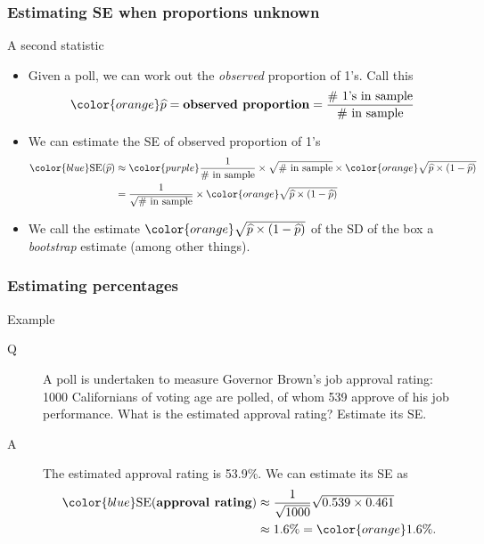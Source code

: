 \documentclass[handout]{beamer}
\begin{document}
   \begin{frame} \frametitle{Estimating SE when proportions unknown}

   \begin{block}
   {A second statistic}
   \begin{itemize}
   \item Given a poll, we can work out the {\em observed}
   proportion of 1's. Call this
   $$
   {\color{orange} \widehat{p}} = \text{\bf observed proportion} = \frac{\text{\# 1's in sample}}{\text{\# in sample}}
   $$
   \item We can estimate the SE of observed proportion of 1's
   $$
   \begin{aligned}
   {\color{blue} \text{SE}(\widehat{p})}& \approx {\color{purple} \frac{1}{\text{\# in sample}}}  \times  \sqrt{\text{\# in sample}} \times
   {\color{orange} \sqrt{\widehat{p} \times (1 - \widehat{p})}} \\
   & = \frac{1}{\sqrt{\text{\# in sample}}} \times
   {\color{orange} \sqrt{\widehat{p} \times (1 - \widehat{p})}} \\
   \end{aligned}
   $$

   \item We call the estimate ${\color{orange} \sqrt{\widehat{p} \times (1 - \widehat{p})}}$ of the SD of the box a {\color{orange} {\em bootstrap}} estimate (among other things).

   \end{itemize}
   \end{block}
   \end{frame}


   \begin{frame} \frametitle{Estimating percentages}

   \begin{block}
   {Example}
   \begin{description}
   \item[Q] A poll is undertaken to measure
   Governor Brown's job approval rating: 1000 Californians
   of voting age are polled, of whom 539 approve of his job performance.
   What is the estimated approval rating? Estimate its SE.

   \item[A] The estimated approval rating is 53.9\%. We can estimate
   its SE as
   $$
   \begin{aligned}
   {\color{blue} \text{SE({\bf approval rating})}} & \approx \frac{1}{\sqrt{1000}} \sqrt{0.539 \times 0.461} \\
   & \approx 1.6 \% = {\color{orange} 1.6\%}.
   \end{aligned}
   $$

   \end{description}
   \end{block}
   \end{frame}
\end{document}
